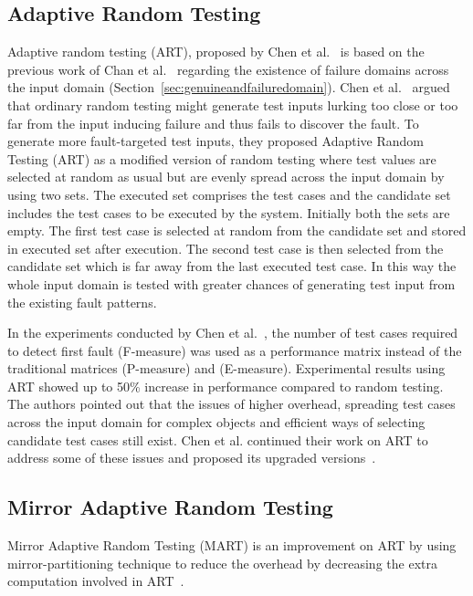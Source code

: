 \subsection{Adaptive Random Testing}
\label{sec:artpatterns_2}
Adaptive random testing (ART), proposed by Chen et al.~\cite{chen2005adaptive} is based on the previous work of Chan et al.~\cite{chan1996proportional} regarding the existence of failure domains across the input domain (Section~\ref{sec:genuineandfailuredomain}). Chen et al.~\cite{chen2005adaptive} argued that ordinary random testing might generate test inputs lurking too close or too far from the input inducing failure and thus fails to discover the fault. To generate more fault-targeted test inputs, they proposed Adaptive Random Testing (ART) as a modified version of random testing where test values are selected at random as usual but are evenly spread across the input domain by using two sets. The executed set comprises the test cases and the candidate set includes the test cases to be executed by the system. Initially both the sets are empty. The first test case is selected at random from the candidate set and stored in executed set after execution. The second test case is then selected from the candidate set which is far away from the last executed test case. In this way the whole input domain is tested with greater chances of generating test input from the existing fault patterns.

In the experiments conducted by Chen et al.~\cite{chen2005adaptive}, the number of test cases required to detect first fault (F-measure) was used as a performance matrix instead of the traditional matrices (P-measure) and (E-measure). Experimental results using ART showed up to 50\% increase in performance compared to random testing. The authors pointed out that the issues of higher overhead, spreading test cases across the input domain for complex objects and efficient ways of selecting candidate test cases still exist. Chen et al. continued their work on ART to address some of these issues and proposed its upgraded versions~\cite{chen2009enhanced}. 

\subsection{Mirror Adaptive Random Testing}
Mirror Adaptive Random Testing (MART) is an improvement on ART by using mirror-partitioning technique to reduce the overhead by decreasing the extra computation involved in ART~\cite{chen2004mirror}. 

